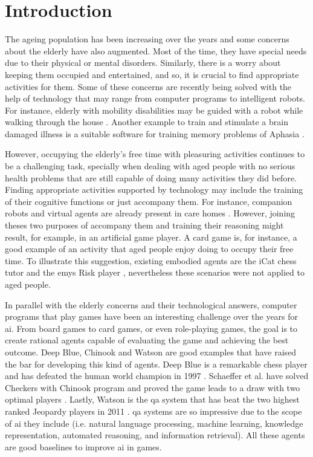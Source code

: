 \section{Introduction} \label{introduction}

The ageing population has been increasing over the years and some concerns about the elderly have also augmented.
Most of the time, they have special needs due to their physical or mental disorders.
Similarly, there is a worry about keeping them occupied and entertained, and so, it is crucial to find appropriate activities for them.
Some of these concerns are recently being solved with the help of technology that may range from computer programs to intelligent robots.
For instance, elderly with mobility disabilities may be guided with a robot while walking through the house \cite{Pollack2002}.
Another example to train and stimulate a brain damaged illness is a suitable software for training memory problems of Aphasia \cite{Pompili2011}.


However, occupying the elderly's free time with pleasuring activities continues to be a challenging task, specially when dealing with aged people with no serious health problems that are still capable of doing many activities they did before.
Finding appropriate activities supported by technology may include the training of their cognitive functions or just accompany them.
For instance, companion robots and virtual agents are already present in care homes \cite{Wada2003,Wada2005,Wada2007,Zancanaro2013}.
However, joining theses two purposes of accompany them and training their reasoning might result, for example, in an artificial game player.
A card game is, for instance, a good example of an activity that aged people enjoy doing to occupy their free time.
To illustrate this suggestion, existing embodied agents are the iCat chess tutor \cite{Affective2007} and the \gls{emys} Risk player \cite{Pereira}, nevertheless these scenarios were not applied to aged people.


In parallel with the elderly concerns and their technological answers, computer programs that play games have been an interesting challenge over the years for \gls{ai}.
From board games to card games, or even role-playing games, the goal is to create rational agents capable of evaluating the game and achieving the best outcome.
Deep Blue, Chinook and Watson are good examples that have raised the bar for developing this kind of agents.
Deep Blue is a remarkable chess player and has defeated the human world champion in 1997 \cite{Campbell2002}.
Schaeffer et al. have solved Checkers with Chinook program and proved the game leads to a draw with two optimal players \cite{Schaeffer1996}.
Lastly, Watson is the \gls{qa} system that has beat the two highest ranked Jeopardy players in 2011 \cite{Ferrucci2010}.
\gls{qa} systems are so impressive due to the scope of \gls{ai} they include (i.e. natural language processing, machine learning, knowledge representation, automated reasoning, and information retrieval).
All these agents are good baselines to improve \gls{ai} in games.


